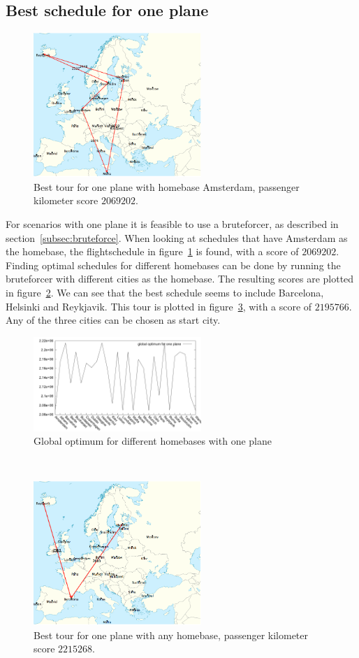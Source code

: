 \documentclass[journal]{IEEEtran}
\begin{document}
\subsection{Best schedule for one plane}
\begin{figure}[!h]
\centering
\includegraphics[width=2.5in]{best_tour_one_plane_amsterdam}
\caption{Best tour for one plane with homebase Amsterdam, passenger kilometer score $\num{2069202}$.}
\label{fig:one_plane_amsterdam}
\end{figure}
For scenarios with one plane it is feasible to use a bruteforcer, as described in section~\ref{subsec:bruteforce}. When looking at schedules that have Amsterdam as the homebase, the flightschedule in figure~\ref{fig:one_plane_amsterdam} is found, with a score of $\num{2069202}$. Finding optimal schedules for different homebases can be done by running the bruteforcer with different cities as the homebase. The resulting scores are plotted in figure~\ref{fig:different_homebase_one_plane}. We can see that the best schedule seems to include Barcelona, Helsinki and Reykjavik. This tour is plotted in figure~\ref{fig:one_plane}, with a score of $\num{2195766}$. Any of the three cities can be chosen as start city.
\\
\begin{figure}[!h]
\centering
\includegraphics[width=2.5in]{different_homebases_one_plane}
\caption{Global optimum for different homebases with one plane}
\label{fig:different_homebase_one_plane}
\end{figure}
\\
\begin{figure}[!h]
\centering
\includegraphics[width=2.5in]{best_tour_one_plane}
\caption{Best tour for one plane with any homebase, passenger kilometer score $\num{2215268}$.}
\label{fig:one_plane}
\end{figure}
\end{document}
